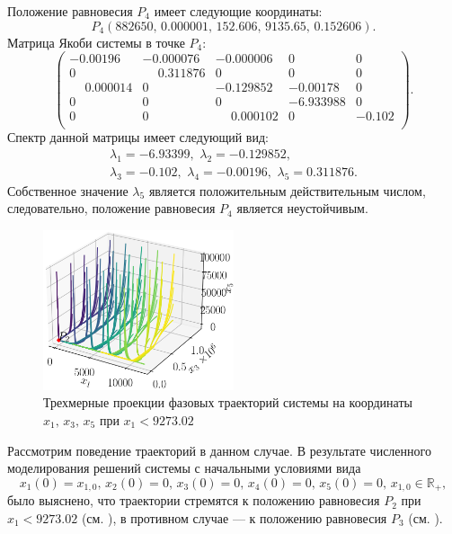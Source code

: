 \documentclass[14pt,a4paper]{extarticle}
\begin{document}
\begin{example}
		Положение равновесия $P_4$ имеет следующие координаты:
		\[P_4\left(882650,\,0.000001,\,152.606,\,9135.65,\,0.152606\right).\]
		Матрица Якоби системы в точке $P_4$: 
		\[\begin{pmatrix}
			-0.00196&  -0.000076 &-0.000006&  0    &    0\\
			 0     &   \phantom{-}0.311876&  0     &   0    &    0\\
			 \phantom{-}0.000014&  0     &  -0.129852& -0.00178 &  0\\
			 0   &     0     &   0    &   -6.933988 & 0\\
			 0    &    0   &     \phantom{-}0.000102 & 0    &   -0.102\\
		\end{pmatrix}.\]
		Спектр данной матрицы имеет следующий вид:
		\begin{multline*}
			\lambda_1=-6.93399,\,\, \lambda_2=-0.129852,\\
			\lambda_3=-0.102,\,\, \lambda_4=-0.00196,\,\, \lambda_5=0.311876.
		\end{multline*}
		Собственное значение $\lambda_5$ является положительным действительным числом, следовательно, положение равновесия $P_4$ является неустойчивым. 
		
		\begin{figure}[h]
			\centering
			\includegraphics[width=0.50\textwidth]{media/Figure_13.png}
			\caption{Трехмерные проекции фазовых траекторий системы на координаты $x_1,\, x_3,\, x_5$ при $x_1 < 9273.02$}
			\label{fig:model_P2_zone}
		\end{figure}
		
		Рассмотрим поведение траекторий в данном случае. В результате численного моделирования решений системы с начальными условиями вида 
		\[x_1(0)=x_{1,0},\, x_2(0)=0,\, x_3(0)=0,\, x_4(0)=0,\, x_5(0)=0,\, x_{1,0}\in\mathbb{R}_{+},\]
		было выяснено, что траектории стремятся к положению равновесия $P_2$ при $x_1 < 9273.02$ (см. ), в противном случае --- к положению равновесия $P_3$ (см. ).
		

\end{example}
\end{document}

